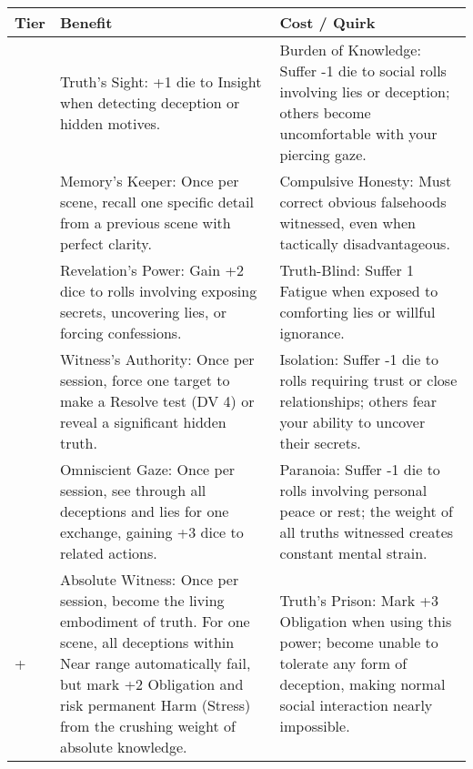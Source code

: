 \begin{longtable}{>{\raggedright\arraybackslash}p{1cm} p{5cm} p{5cm}}
\toprule
\textbf{Tier} & \textbf{Benefit} & \textbf{Cost / Quirk} \\
\midrule
1 & Truth's Sight: +1 die to Insight when detecting deception or hidden motives. & Burden of Knowledge: Suffer -1 die to social rolls involving lies or deception; others become uncomfortable with your piercing gaze. \\
\midrule
2 & Memory's Keeper: Once per scene, recall one specific detail from a previous scene with perfect clarity. & Compulsive Honesty: Must correct obvious falsehoods witnessed, even when tactically disadvantageous. \\
\midrule
3 & Revelation's Power: Gain +2 dice to rolls involving exposing secrets, uncovering lies, or forcing confessions. & Truth-Blind: Suffer 1 Fatigue when exposed to comforting lies or willful ignorance. \\
\midrule
4 & Witness's Authority: Once per session, force one target to make a Resolve test (DV 4) or reveal a significant hidden truth. & Isolation: Suffer -1 die to rolls requiring trust or close relationships; others fear your ability to uncover their secrets. \\
\midrule
5 & Omniscient Gaze: Once per session, see through all deceptions and lies for one exchange, gaining +3 dice to related actions. & Paranoia: Suffer -1 die to rolls involving personal peace or rest; the weight of all truths witnessed creates constant mental strain. \\
\midrule
6+ & Absolute Witness: Once per session, become the living embodiment of truth. For one scene, all deceptions within Near range automatically fail, but mark +2 Obligation and risk permanent Harm (Stress) from the crushing weight of absolute knowledge. & Truth's Prison: Mark +3 Obligation when using this power; become unable to tolerate any form of deception, making normal social interaction nearly impossible. \\
\bottomrule
\end{longtable}